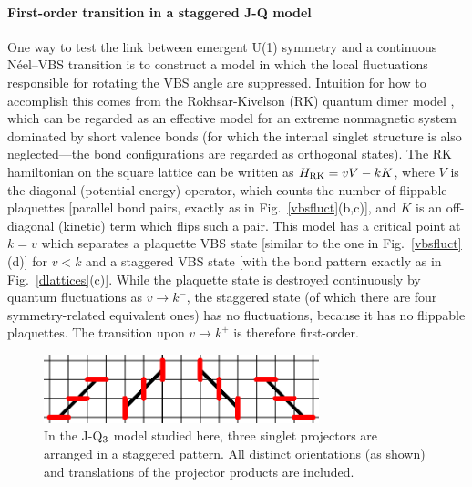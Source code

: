 \documentclass[draft,numberedheadings]{aipproc}
\begin{document}
\paragraph{First-order transition in a staggered J-Q model}

One way to test the link between emergent U(1) symmetry and a continuous N\'eel--VBS transition is to construct a model in which the local
fluctuations responsible for rotating the VBS angle are suppressed. Intuition for how to accomplish this comes from the Rokhsar-Kivelson (RK)
quantum dimer model \cite{rk88,fradkin04}, which can be regarded as an effective model for an extreme nonmagnetic system dominated by short valence bonds 
(for which the internal singlet structure is also neglected---the bond configurations are regarded as orthogonal states). The RK hamiltonian on 
the square lattice can be written as $H_{\rm RK}=vV-kK$, where $V$ is the diagonal (potential-energy) operator, which counts the number of flippable 
plaquettes [parallel bond pairs, exactly as in Fig.~\ref{vbsfluct}(b,c)], and $K$ is an off-diagonal (kinetic) term which flips such a pair. This 
model has a critical point at $k=v$ which separates a plaquette VBS state [similar to the one in Fig.~\ref{vbsfluct}(d)] for $v<k$ and a 
staggered VBS state [with the bond pattern exactly as in Fig.~\ref{dlattices}(c)]. While the plaquette state is destroyed continuously by quantum 
fluctuations as $v \to k^-$, the staggered state (of which there are four symmetry-related equivalent ones) has no fluctuations, because it has 
no flippable plaquettes. The transition upon $v\to k^+$ is therefore first-order. 

\begin{figure}
\includegraphics[width=8cm, clip]{jq3oper.eps}
\caption{In the J-Q$_{\rm 3}$ model studied here, three singlet projectors are arranged in a staggered pattern. All distinct orientations
(as shown) and translations of the projector products are included.}
\label{jq3oper}
\end{figure}
\end{document}
